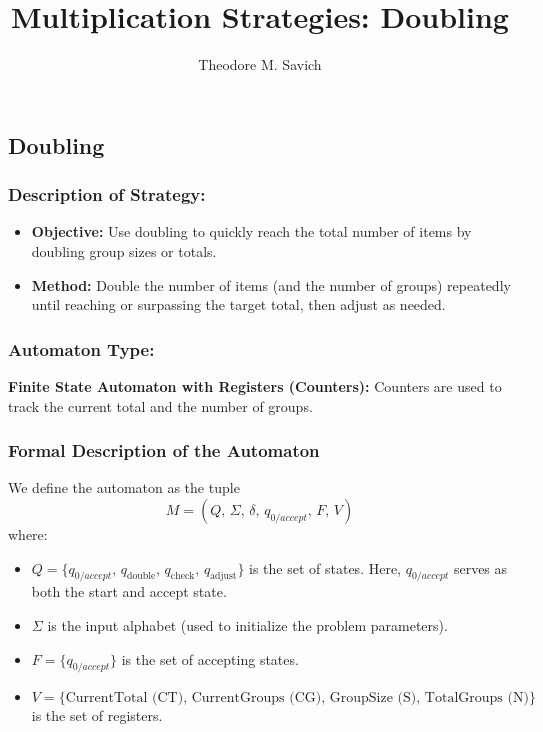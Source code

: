 \documentclass[11pt]{article}
\title{Multiplication Strategies: Doubling}
\author{Theodore M. Savich}
\begin{document}
\maketitle
\subsection*{Doubling}

\subsubsection*{Description of Strategy:}
\begin{itemize}
    \item \textbf{Objective:} Use doubling to quickly reach the total number of items by doubling group sizes or totals.
    \item \textbf{Method:} Double the number of items (and the number of groups) repeatedly until reaching or surpassing the target total, then adjust as needed.
\end{itemize}

\subsubsection*{Automaton Type:}
\textbf{Finite State Automaton with Registers (Counters):}  
Counters are used to track the current total and the number of groups.

\subsubsection*{Formal Description of the Automaton}

We define the automaton as the tuple
\[
M = (Q,\, \Sigma,\, \delta,\, q_{0/accept},\, F,\, V)
\]
where:
\begin{itemize}
    \item \( Q = \{q_{0/accept},\, q_{\text{double}},\, q_{\text{check}},\, q_{\text{adjust}}\} \) is the set of states. Here, \(q_{0/accept}\) serves as both the start and accept state.
    \item \(\Sigma\) is the input alphabet (used to initialize the problem parameters).
    \item \( F = \{q_{0/accept}\} \) is the set of accepting states.
    \item \( V = \{\text{CurrentTotal (CT)},\, \text{CurrentGroups (CG)},\, \text{GroupSize (S)},\, \text{TotalGroups (N)}\} \) is the set of registers.
\end{itemize}
\end{document}
